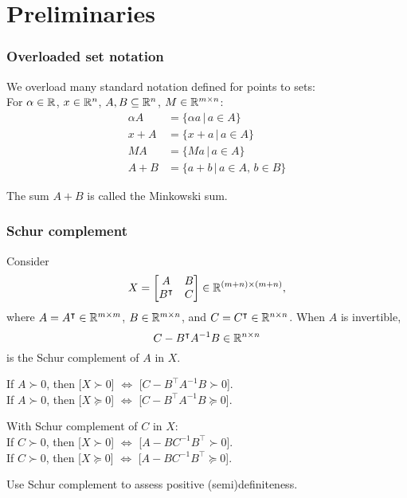 \documentclass[10pt,mathserif]{beamer}
\begin{document}
\section{Preliminaries}
\begin{frame}
\frametitle{Overloaded set notation}
We overload many standard notation defined for points to sets:\\
For $\alpha\in \mathbb{R}$, $x\in \mathbb{R}^n$,  $A,B\subseteq \mathbb{R}^n$, $M\in \mathbb{R}^{m\times n}$:
\begin{align*}
\alpha A&=\{\alpha a\,|\,a\in A\}\\
x+A&=\{x+a\,|\,a\in A\}\\
MA&=\{Ma\,|\,a\in A\}\\
A+B&=\{a+b\,|\,a\in A,\,b\in B\}
\end{align*}
\vspace{0.2in}

The sum $A+B$ is called the Minkowski sum.

\end{frame}



\begin{frame}
\frametitle{Schur complement}
Consider
\[
X=
\begin{bmatrix}
A&B\\
B^\intercal&C
\end{bmatrix}\in \mathbb{R}^{(m+n)\times (m+n)},
\]
where $A=A^\intercal\in \mathbb{R}^{m\times m}$, $B\in \mathbb{R}^{m\times n}$, and
$C=C^\intercal\in \mathbb{R}^{n\times n}$.
When $A$ is invertible,
\[
C-B^\intercal A^{-1}B\in \mathbb{R}^{n\times n}
\]
is the Schur complement of $A$ in $X$.

\vspace{0.2in}

If $A\succ 0$, then [$X\succ 0$] $\Leftrightarrow$ [$C-B^\intercal A^{-1}B\succ 0$].\\
If $A\succ 0$, then [$X\succeq 0$] $\Leftrightarrow$ [$C-B^\intercal A^{-1}B\succeq 0$].


\vspace{0.2in}

With Schur complement of $C$ in $X$:\\
If $C\succ 0$, then [$X\succ 0$] $\Leftrightarrow$ [$A-BC^{-1}B^\intercal \succ 0$].\\
If $C\succ 0$, then [$X\succeq 0$] $\Leftrightarrow$ [$A-BC^{-1}B^\intercal\succeq 0$].

\vspace{0.2in}
Use Schur complement to assess positive (semi)definiteness.
\end{frame}
\end{document}
